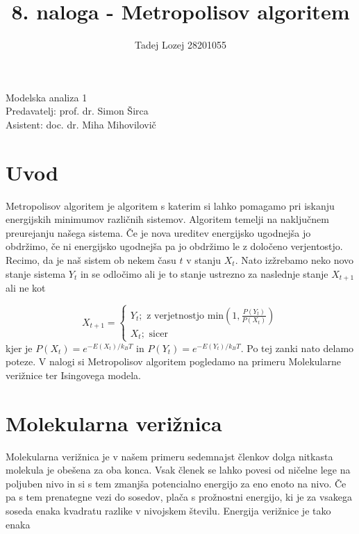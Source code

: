 \documentclass[slovene,11pt,a4paper]{article}
\begin{document}
\title{8. naloga - Metropolisov algoritem}
\author{Tadej Lozej 28201055}
\maketitle
\begin{center}
Modelska analiza 1 \\
\bigskip
Predavatelj: prof. dr. Simon Širca \\
Asistent: doc. dr. Miha Mihovilovič
\end{center}

\newpage

\tableofcontents

\newpage

\section{Uvod}


Metropolisov algoritem je algoritem s katerim si lahko pomagamo pri iskanju energijskih minimumov različnih sistemov. Algoritem temelji na naključnem preurejanju našega sistema. Če je nova ureditev energijsko ugodnejša jo obdržimo, če ni energijsko ugodnejša pa jo obdržimo le z določeno verjentostjo. Recimo, da je naš sistem ob nekem času $t$ v stanju $X_t$. Nato izžrebamo neko novo stanje sistema $Y_t$ in se odločimo ali je to stanje ustrezno za naslednje stanje $X_{t+1}$ ali ne kot

\begin{equation}
X_{t+1} = 
	\begin{cases}
	Y_t; \text{ z verjetnostjo } \text{min} \left(1, \frac{P(Y_t)}{P(X_t)} \right)\\
	X_t; \text{ sicer}
	\end{cases}
\end{equation}
kjer je $P(X_t) = e^{-E(X_t)/k_BT}$ in $P(Y_t) = e^{-E(Y_t)/k_BT}$. Po tej zanki nato delamo poteze. V nalogi si Metropolisov algoritem pogledamo na primeru Molekularne verižnice ter Isingovega modela.

\section{Molekularna verižnica}

Molekularna verižnica je v našem primeru sedemnajst členkov dolga nitkasta molekula je obešena za oba konca. Vsak členek se lahko povesi od ničelne lege na poljuben nivo in si s tem zmanjša potencialno energijo za eno enoto na nivo. Če pa s tem prenategne vezi do sosedov, plača s prožnostni energijo, ki je za vsakega soseda enaka kvadratu razlike v nivojskem številu. Energija verižnice je tako enaka
\end{document}
